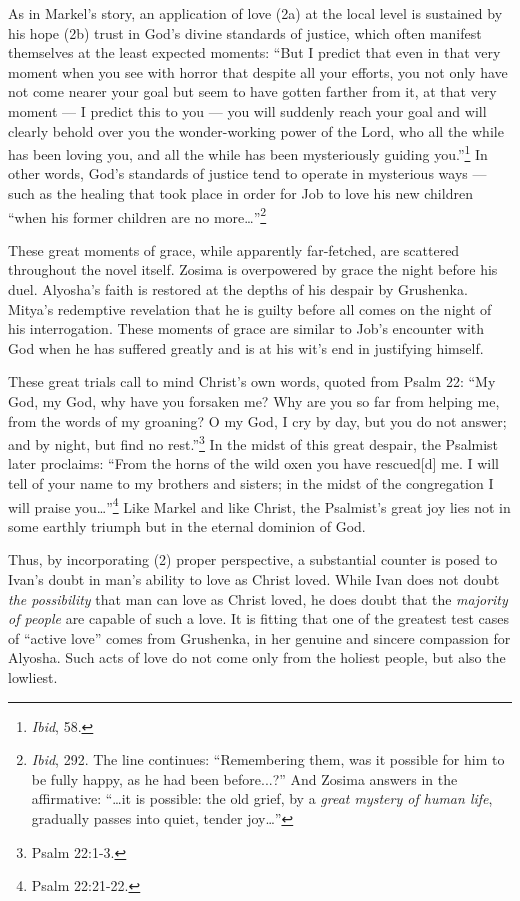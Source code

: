 As in Markel's story, an application of love (2a) at the local level is sustained by his hope (2b) trust in God's divine standards of justice, which often manifest themselves at the least expected moments: ``But I predict that even in that very moment when you see with horror that despite all your efforts, you not only have not come nearer your goal but seem to have gotten farther from it, at that very moment --- I predict this to you --- you will suddenly reach your goal and will clearly behold over you the wonder-working power of the Lord, who all the while has been loving you, and all the while has been mysteriously guiding you.''\footnote{\emph{Ibid}, 58.} In other words, God's standards of justice tend to operate in mysterious ways --- such as the healing that took place in order for Job to love his new children ``when his former children are no more\ldots''\footnote{\emph{Ibid}, 292. The line continues: ``Remembering them, was it possible for him to be fully happy, as he had been before...?'' And Zosima answers in the affirmative: ``\ldots it is possible: the old grief, by a \emph{great mystery of human life}, gradually passes into quiet, tender joy\ldots''}

These great moments of grace, while apparently far-fetched, are scattered throughout the novel itself. Zosima is overpowered by grace the night before his duel. Alyosha's faith is restored at the depths of his despair by Grushenka. Mitya's redemptive revelation that he is guilty before all comes on the night of his interrogation. These moments of grace are similar to Job's encounter with God when he has suffered greatly and is at his wit's end in justifying himself. 

These great trials call to mind Christ's own words, quoted from Psalm 22: ``My God, my God, why have you forsaken me? Why are you so far from helping me, from the words of my groaning? O my God, I cry by day, but you do not answer; and by night, but find no rest.''\footnote{Psalm 22:1-3.} In the midst of this great despair, the Psalmist later proclaims: ``From the horns of the wild oxen you have rescued[d] me. I will tell of your name to my brothers and sisters; in the midst of the congregation I will praise you\ldots''\footnote{Psalm 22:21-22.} Like Markel and like Christ, the Psalmist's great joy lies not in some earthly triumph but in the eternal dominion of God. 

Thus, by incorporating (2) proper perspective, a substantial counter is posed to Ivan's doubt in man's ability to love as Christ loved. While Ivan does not doubt \emph{the possibility} that man can love as Christ loved, he does doubt that the \emph{majority of people} are capable of such a love. It is fitting that one of the greatest test cases of ``active love'' comes from Grushenka, in her genuine and sincere compassion for Alyosha. Such acts of love do not come only from the holiest people, but also the lowliest.

